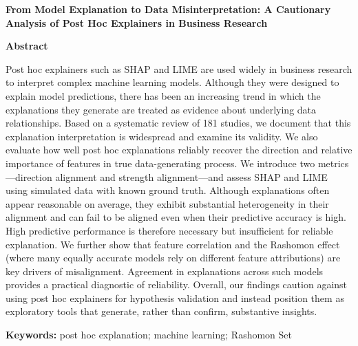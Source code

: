 \documentclass[11pt]{article}
\begin{document}
\begin{center}
    {\Large \textbf{From Model Explanation to Data Misinterpretation: A Cautionary Analysis of Post Hoc Explainers in Business Research}}
\end{center}

\vspace{0.5em}

\vspace{-0.5cm}
\begin{center}
\textbf{Abstract}
\end{center}
Post hoc explainers such as SHAP and LIME are used widely in business research to interpret complex machine learning models. Although they were designed to explain model predictions, there has been an increasing trend in which the explanations they generate are treated as evidence about underlying data relationships. Based on a systematic review of 181 studies, we document that this explanation interpretation is widespread and examine its validity.
We also evaluate how well post hoc explanations reliably recover the direction and relative importance of features in true data-generating process. We introduce two metrics—direction alignment and strength alignment—and assess SHAP and LIME using simulated data with known ground truth. Although explanations often appear reasonable on average, they exhibit substantial heterogeneity in their alignment and can fail to be aligned even when their predictive accuracy is high. High predictive performance is therefore necessary but insufficient for reliable explanation.
We further show that feature correlation and the Rashomon effect (where many equally accurate models rely on different feature attributions) are key drivers of misalignment. Agreement in explanations across such models provides a practical diagnostic of reliability. Overall, our findings caution against using post hoc explainers for hypothesis validation and instead position them as exploratory tools that generate, rather than confirm, substantive insights.
\vspace{0.5em}

\noindent
\textbf{Keywords:}
post hoc explanation; machine learning; Rashomon Set




%
\end{document}
